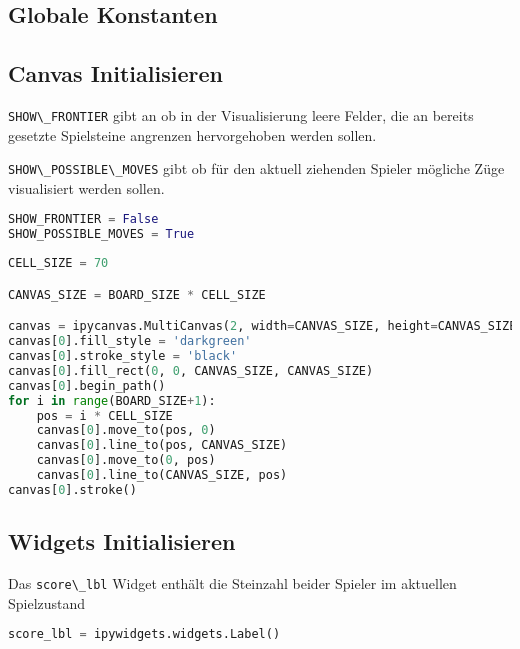 \hypertarget{globale-konstanten-1}{%
\subsection{Globale Konstanten}\label{globale-konstanten-1}}

\hypertarget{canvas-initialisieren}{%
\subsection{Canvas Initialisieren}\label{canvas-initialisieren}}

\passthrough{\lstinline!SHOW\_FRONTIER!} gibt an ob in der
Visualisierung leere Felder, die an bereits gesetzte Spielsteine
angrenzen hervorgehoben werden sollen.

\passthrough{\lstinline!SHOW\_POSSIBLE\_MOVES!} gibt ob für den aktuell
ziehenden Spieler mögliche Züge visualisiert werden sollen.

\begin{lstlisting}[language=Python]
SHOW_FRONTIER = False
SHOW_POSSIBLE_MOVES = True
\end{lstlisting}

\begin{lstlisting}[language=Python]
CELL_SIZE = 70

CANVAS_SIZE = BOARD_SIZE * CELL_SIZE

canvas = ipycanvas.MultiCanvas(2, width=CANVAS_SIZE, height=CANVAS_SIZE)
canvas[0].fill_style = 'darkgreen'
canvas[0].stroke_style = 'black'
canvas[0].fill_rect(0, 0, CANVAS_SIZE, CANVAS_SIZE)
canvas[0].begin_path()
for i in range(BOARD_SIZE+1):
    pos = i * CELL_SIZE
    canvas[0].move_to(pos, 0)
    canvas[0].line_to(pos, CANVAS_SIZE)
    canvas[0].move_to(0, pos)
    canvas[0].line_to(CANVAS_SIZE, pos)
canvas[0].stroke()
\end{lstlisting}

\hypertarget{widgets-initialisieren}{%
\subsection{Widgets Initialisieren}\label{widgets-initialisieren}}

Das \passthrough{\lstinline!score\_lbl!} Widget enthält die Steinzahl
beider Spieler im aktuellen Spielzustand

\begin{lstlisting}[language=Python]
score_lbl = ipywidgets.widgets.Label()
\end{lstlisting}

